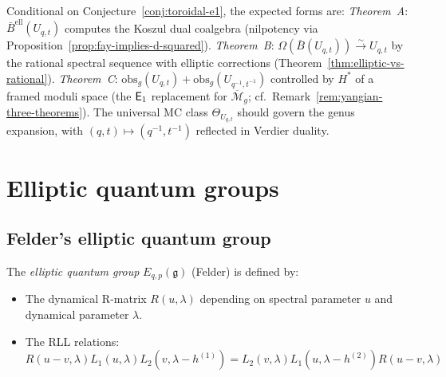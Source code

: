 \begin{remark}
\label{rem:toroidal-three-theorems}
Conditional on Conjecture~\ref{conj:toroidal-e1}, the expected forms are:
\emph{Theorem~A}: $\bar{B}^{\mathrm{ell}}(U_{q,t})$ computes the Koszul dual coalgebra (nilpotency via Proposition~\ref{prop:fay-implies-d-squared}).
\emph{Theorem~B}: $\Omega(\bar{B}(U_{q,t})) \xrightarrow{\sim} U_{q,t}$ by the rational spectral sequence with elliptic corrections (Theorem~\ref{thm:elliptic-vs-rational}).
\emph{Theorem~C}: $\mathrm{obs}_g(U_{q,t}) + \mathrm{obs}_g(U_{q^{-1},t^{-1}})$ controlled by $H^*$ of a framed moduli space (the $\mathsf{E}_1$ replacement for $\overline{\mathcal{M}}_g$; cf.\ Remark~\ref{rem:yangian-three-theorems}).
The universal MC class $\Theta_{U_{q,t}}$ should govern the genus expansion, with $(q,t) \mapsto (q^{-1},t^{-1})$ reflected in Verdier duality.
\end{remark}


\section{Elliptic quantum groups}
\label{sec:elliptic-quantum}

\subsection{Felder's elliptic quantum group}

\begin{definition}\label{def:elliptic-quantum}
The \emph{elliptic quantum group} $E_{q,p}(\mathfrak{g})$ (Felder) is defined by:
\begin{itemize}
\item The dynamical R-matrix $R(u, \lambda)$ depending on spectral parameter $u$ 
and dynamical parameter $\lambda$.
\item The RLL relations:
\[
R(u-v, \lambda) L_1(u, \lambda) L_2(v, \lambda - h^{(1)}) = L_2(v, \lambda) L_1(u, \lambda - h^{(2)}) R(u-v, \lambda)
\]
\end{itemize}
\end{definition}

